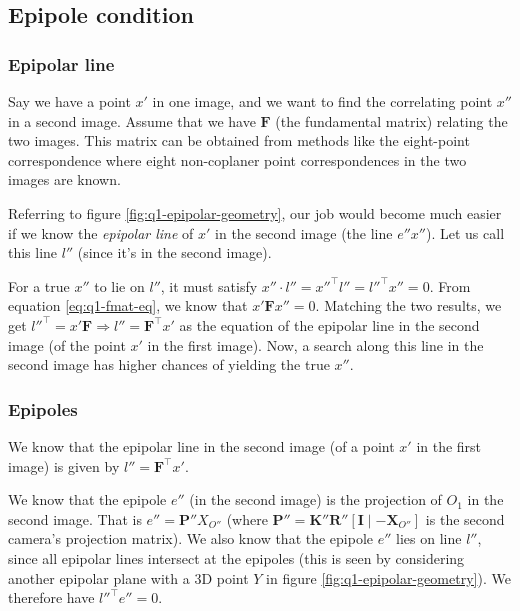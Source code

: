 
\subsection{Epipole condition}

\subsubsection*{Epipolar line}

Say we have a point $x'$ in one image, and we want to find the correlating point $x''$ in a second image. Assume that we have $\mathbf{F}$ (the fundamental matrix) relating the two images. This matrix can be obtained from methods like the eight-point correspondence where eight non-coplaner point correspondences in the two images are known.

Referring to figure \ref{fig:q1-epipolar-geometry}, our job would become much easier if we know the \textit{epipolar line} of $x'$ in the second image (the line $e''x''$). Let us call this line $l''$ (since it's in the second image).

For a true $x''$ to lie on $l''$, it must satisfy $x'' \cdot l'' = x''^\top l'' = l''^\top x'' = 0$. From equation \ref{eq:q1-fmat-eq}, we know that $x' \mathbf{F} x'' = 0$. Matching the two results, we get $l''^\top = x' \mathbf{F} \Rightarrow l'' = \mathbf{F}^\top x' $ as the equation of the epipolar line in the second image (of the point $x'$ in the first image). Now, a search along this line in the second image has higher chances of yielding the true $x''$.

\subsubsection*{Epipoles}

We know that the epipolar line in the second image (of a point $x'$ in the first image) is given by $l'' = \mathbf{F}^\top x'$.

We know that the epipole $e''$ (in the second image) is the projection of $O_1$ in the second image. That is $e'' = \mathbf{P}'' X_{O''}$ (where $\mathbf{P}'' = \mathbf{K}'' \mathbf{R}'' \left [ \mathbf{I} \mid -\mathbf{X}_{O''} \right ]$ is the second camera's projection matrix). We also know that the epipole $e''$ lies on line $l''$, since all epipolar lines intersect at the epipoles (this is seen by considering another epipolar plane with a 3D point $Y$ in figure \ref{fig:q1-epipolar-geometry}). We therefore have $l''^\top e'' = 0$.

